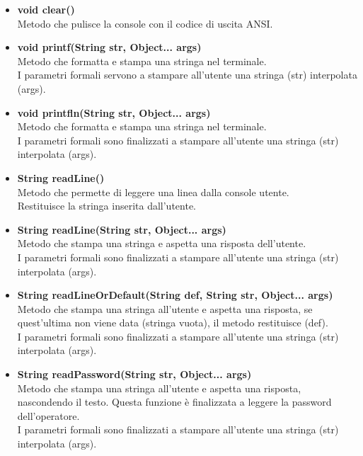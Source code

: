 \documentclass[a4paper, 12pt]{scrreprt}
\begin{document}
				\begin{itemize}
					\item \textbf{void clear()}
					\\Metodo che pulisce la console con il codice di uscita ANSI.
					
					\item \textbf{void printf(String str, Object... args)}
					\\Metodo che formatta e stampa una stringa nel terminale.
					\\I parametri formali servono a stampare all'utente una stringa (str) interpolata (args).
					
					\item \textbf{void printfln(String str, Object... args)}
					\\Metodo che formatta e stampa una stringa nel terminale.
					\\I parametri formali sono finalizzati a stampare all'utente una stringa (str) interpolata (args).
					
					\item \textbf{String readLine()}
					\\Metodo che permette di leggere una linea dalla console utente.
					\\Restituisce la stringa inserita dall'utente.
					
					\item \textbf{String readLine(String str, Object... args)}
					\\Metodo che stampa una stringa e aspetta una risposta dell'utente.
					\\I parametri formali sono finalizzati a stampare all'utente una stringa (str) interpolata (args).
					
					\item \textbf{String readLineOrDefault(String def, String str, Object... args)}
					\\Metodo che stampa una stringa all'utente e aspetta una risposta, se quest'ultima non viene data (stringa vuota), il metodo restituisce (def).
					\\I parametri formali sono finalizzati a stampare all'utente una stringa (str) interpolata (args).
					
					\item \textbf{String readPassword(String str, Object... args)}
					\\Metodo che stampa una stringa all'utente e aspetta una risposta, nascondendo il testo. Questa funzione \`e finalizzata a leggere la password dell'operatore.
					\\I parametri formali sono finalizzati a stampare all'utente una stringa (str) interpolata (args).
					

\end{itemize}
\end{document}
